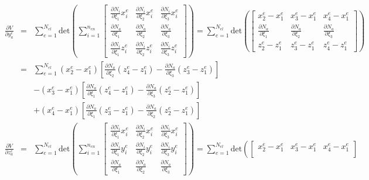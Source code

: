 \documentclass[12pt,aps,pre]{revtex4}
\begin{document}
\begin{eqnarray}
\frac{\partial V}{\partial y_a^e} &=& \sum_{e=1}^{N_{el}} \text{det}\left(\sum_{i=1}^{n_{en}} \begin{bmatrix}
\frac{\partial N_i}{\partial \xi_1}x_i^e  & \frac{\partial N_i}{\partial \xi_2}x_i^e  & \frac{\partial N_i}{\partial \xi_3}x_i^e \\
%
\frac{\partial N_a}{\partial \xi_1} & \frac{\partial N_a}{\partial \xi_2} & \frac{\partial N_a}{\partial \xi_3} \\
%
\frac{\partial N_i}{\partial \xi_1}z_i^e  & \frac{\partial N_i}{\partial \xi_2}z_i^e & \frac{\partial N_i}{\partial \xi_3}z_i^e 
\end{bmatrix}\right) 
= \sum_{e=1}^{N_{el}} \text{det}\left( \begin{bmatrix}
x_2^e - x_1^e & x_3^e - x_1^e & x_4^e - x_1^e \\
%
\frac{\partial N_a}{\partial \xi_1} & \frac{\partial N_a}{\partial \xi_2} & \frac{\partial N_a}{\partial \xi_3} \\
%
z_2^e - z_1^e & z_3^e - z_1^e & z_4^e - z_1^e 
\end{bmatrix}\right)
\nonumber\\
%
&=&\sum_{e=1}^{N_{el}}(x_2^e - x_1^e)\left[\frac{\partial N_a}{\partial \xi_2}(z_4^e - z_1^e)-\frac{\partial N_a}{\partial \xi_3}(z_3^e - z_1^e)\right] \nonumber\\
%
&&-(x_3^e - x_1^e)\left[\frac{\partial N_a}{\partial \xi_1}(z_4^e - z_1^e)-\frac{\partial N_a}{\partial \xi_3}(z_2^e - z_1^e)\right] \nonumber\\
%
&&+(x_4^e - x_1^e)\left[\frac{\partial N_a}{\partial \xi_1}(z_3^e - z_1^e)-\frac{\partial N_a}{\partial \xi_2}(z_2^e - z_1^e)\right] \nonumber\\
\frac{\partial V}{\partial z_a^e} &=& \sum_{e=1}^{N_{el}} \text{det}\left(\sum_{i=1}^{n_{en}} \begin{bmatrix}
\frac{\partial N_i}{\partial \xi_1}x_i^e  & \frac{\partial N_i}{\partial \xi_2}x_i^e & \frac{\partial N_i}{\partial \xi_3}x_i^e \\
%
\frac{\partial N_i}{\partial \xi_1}y_i^e & \frac{\partial N_i}{\partial \xi_2}y_i^e & \frac{\partial N_i}{\partial \xi_3}y_i^e \\
%
\frac{\partial N_a}{\partial \xi_1}  & \frac{\partial N_a}{\partial \xi_2} & \frac{\partial N_a}{\partial \xi_3} 
\end{bmatrix}\right) 
= \sum_{e=1}^{N_{el}} \text{det}\left( \begin{bmatrix}
x_2^e - x_1^e & x_3^e - x_1^e & x_4^e - x_1^e \\

\end{bmatrix}
\end{eqnarray}
\end{document}
